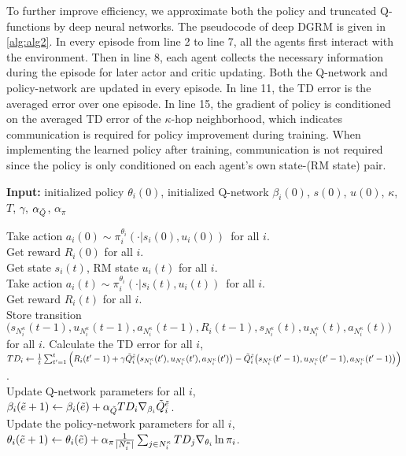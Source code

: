 \documentclass[conf]{new-aiaa}
\def\foo ABC{DGRM}
\begin{document}
To further improve efficiency, we approximate both the policy and truncated Q-functions by deep neural networks. The pseudocode of deep \foo ABC is given in \cref{alg:alg2}. In every episode from line 2 to line 7, all the agents first interact with the environment. Then in line 8, each agent collects the necessary information during the episode for later actor and critic updating. Both the Q-network and policy-network are updated in every episode. In line 11, the TD error is the averaged error over one episode. In line 15, the gradient of policy is conditioned on the averaged TD error of the $\kappa$-hop neighborhood, which indicates communication is required for policy improvement during training. When implementing the learned policy after training, communication is not required since the policy is only conditioned on each agent's own state-(RM state) pair.

\begin{algorithm}[tb]
\textbf{Input:} initialized policy $\theta_i(0)$, initialized Q-network $\beta_i(0)$, $s(0)$, $u(0)$, $\kappa$, $T$, $\gamma$, $\alpha_{\Tilde{Q}}$, $\alpha_\pi$ 
\begin{algorithmic}[1]
 \STATE Take action $a_i(0) \sim \pi_i^{\theta_i}(\cdot | s_i(0), u_i(0))$\ for all $i$.\\
 \STATE Get reward $R_i(0)$ for all $i$.\\
 \STATE Get state $s_i(t)$, RM state $u_i(t)$ for all $i$.\\
 \STATE Take action $a_i(t) \sim \pi_i^{\theta_i}(\cdot | s_i(t), u_i(t))$\ for all $i$.\\
 \STATE Get reward $R_i(t)$ for all $i$.\\
 \STATE Store transition $\big(s_{N_i^\kappa}(t-1), u_{N_i^\kappa}(t-1), a_{N_i^\kappa}(t-1), R_i(t-1), s_{N_i^\kappa}(t), u_{N_i^\kappa}(t), a_{N_i^\kappa}(t)\big)$ for all $i$.
 \ENDWHILE
 \STATE Calculate the TD error for all $i$, \\
 \STATE $TD_i \gets \frac{1}{t} \sum_{t'=1}^t \Big(R_i(t'-1) + \gamma \Tilde{Q}_i^{\Tilde{e}}\big(s_{N_i^\kappa}(t'), u_{N_i^\kappa}(t'),
 a_{N_i^\kappa}(t')\big) - \Tilde{Q}_i^{\Tilde{e}}\big(s_{N_i^\kappa}(t'-1), u_{N_i^\kappa}(t'-1), a_{N_i^\kappa}(t'-1)\big)\Big)$. \\
 \STATE Update Q-network parameters for all $i$,\\
 \STATE $\beta_i(\Tilde{e}+1) \gets \beta_i(\Tilde{e}) + \alpha_{\Tilde{Q}} TD_i \nabla_{\beta_i} \Tilde{Q}_i^{\Tilde{e}}$.\\
 \STATE Update the policy-network parameters for all $i$,\\
 \STATE $\theta_i(\Tilde{e}+1) \gets \theta_i(\Tilde{e}) + \alpha_{\pi} \frac{1}{|N_i^{\kappa}|} \sum_{j \in N_i^{\kappa}} TD_j \nabla_{\theta_i} \ln \pi_i$.
\ENDFOR
\end{algorithmic}
\caption{Deep \foo ABC Algorithm}
\label{alg:alg2}
\end{algorithm}
\end{document}
